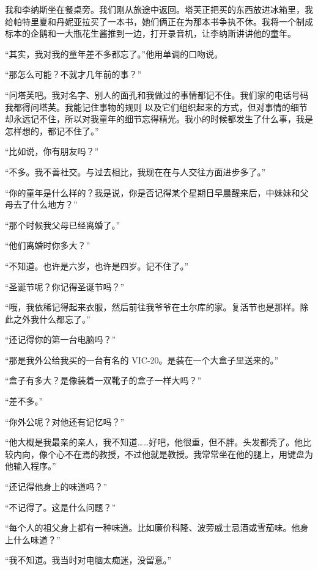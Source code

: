  

我和李纳斯坐在餐桌旁。我们刚从旅途中返回。塔芙正把买的东西放进冰箱里，我给帕特里夏和丹妮亚拉买了一本书，她们俩正在为那本书争执不休。我将一个制成标本的企鹅和一大瓶花生酱推到一边，打开录音机，让李纳斯讲讲他的童年。

“其实，我对我的童年差不多都忘了。”他用单调的口吻说。

“那怎么可能？不就才几年前的事？”

“问塔芙吧。我对名字、别人的面孔和我做过的事情都记不住。我们家的电话号码我都得问塔芙。我能记住事物的规则 以及它们组织起来的方式，但对事情的细节却永远记不住，所以对我童年的细节忘得精光。我小的时候都发生了什么事，我是怎样想的，都记不住了。”

“比如说，你有朋友吗？”

“不多。我不善社交。与过去相比，我现在在与人交往方面进步多了。”

“你的童年是什么样的？我是说，你是否记得某个星期日早晨醒来后，中妹妹和父母去了什么地方？”

“那个时候我父母已经离婚了。”

“他们离婚时你多大？”

“不知道。也许是六岁，也许是四岁。记不住了。”

“圣诞节呢？你记得圣诞节吗？”

“哦，我依稀记得起来衣服，然后前往我爷爷在土尔库的家。复活节也是那样。除此之外我什么都忘了。”

“还记得你的第一台电脑吗？”

“那是我外公给我买的一台有名的 VIC-20。是装在一个大盒子里送来的。”

“盒子有多大？是像装着一双靴子的盒子一样大吗？”

“差不多。”

“你外公呢？对他还有记忆吗？”

“他大概是我最亲的亲人，我不知道……好吧，他很重，但不胖。头发都秃了。他比较内向，像个心不在焉的教授，不过他就是教授。我常常坐在他的腿上，用键盘为他输入程序。”

“还记得他身上的味道吗？”

“不记得了。这是什么问题？”

“每个人的祖父身上都有一种味道。比如廉价科隆、波旁威士忌酒或雪茄味。他身上什么味道？”

“我不知道。我当时对电脑太痴迷，没留意。”
